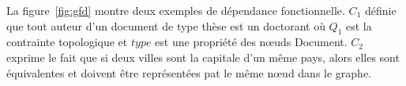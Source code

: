 \begin{example}
    La figure~\ref{fig:gfd} montre deux exemples de dépendance fonctionnelle.
    $C_1$ définie que tout auteur d'un document de type thèse est un doctorant où $Q_1$ est la contrainte topologique et $type$ est une propriété des nœuds Document.
    $C_2$ exprime le fait que si deux villes sont la capitale d'un même pays, alors elles sont équivalentes et doivent être représentées pat le même nœud dans le graphe.
\end{example}

\FloatBarrier
